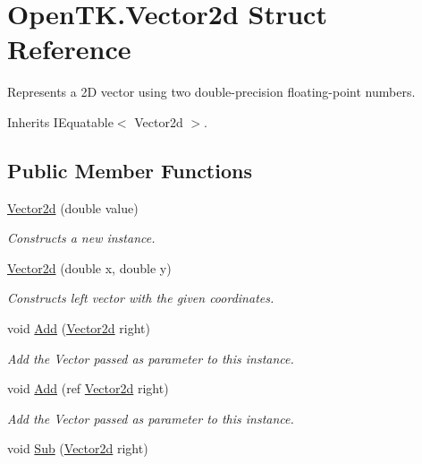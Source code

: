 \hypertarget{struct_open_t_k_1_1_vector2d}{\section{Open\-T\-K.\-Vector2d Struct Reference}
\label{struct_open_t_k_1_1_vector2d}
}


Represents a 2\-D vector using two double-\/precision floating-\/point numbers. 




Inherits I\-Equatable$<$ Vector2d $>$.

\subsection*{Public Member Functions}
\begin{DoxyCompactItemize}
\item 
\hyperlink{struct_open_t_k_1_1_vector2d_ab1ef1fd6f8d3e24c94a62654caf19a5a}{Vector2d} (double value)
\begin{DoxyCompactList}\small\item\em Constructs a new instance. \end{DoxyCompactList}\item 
\hyperlink{struct_open_t_k_1_1_vector2d_a39cb7f684191381835c2898762af5d1a}{Vector2d} (double x, double y)
\begin{DoxyCompactList}\small\item\em Constructs left vector with the given coordinates.\end{DoxyCompactList}\item 
void \hyperlink{struct_open_t_k_1_1_vector2d_a3aca3a33031d205732b63ba6ccc498a0}{Add} (\hyperlink{struct_open_t_k_1_1_vector2d}{Vector2d} right)
\begin{DoxyCompactList}\small\item\em Add the Vector passed as parameter to this instance.\end{DoxyCompactList}\item 
void \hyperlink{struct_open_t_k_1_1_vector2d_a4d7ef861a76264c3af6451f9aad2018c}{Add} (ref \hyperlink{struct_open_t_k_1_1_vector2d}{Vector2d} right)
\begin{DoxyCompactList}\small\item\em Add the Vector passed as parameter to this instance.\end{DoxyCompactList}\item 
void \hyperlink{struct_open_t_k_1_1_vector2d_a10928e4fdfbbeb9d1456d40bcae37ff3}{Sub} (\hyperlink{struct_open_t_k_1_1_vector2d}{Vector2d} right)

\end{DoxyCompactItemize}

